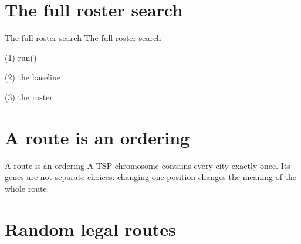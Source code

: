 \section{The full roster search}

\begin{frame}{The full roster search}
The full roster search
\end{frame}

\begin{frame}[fragile]{(1) run()}

\end{frame}

\begin{frame}[fragile]{(2) the baseline}

\end{frame}

\begin{frame}[fragile]{(3) the roster}

\end{frame}


\section{A route is an ordering}

\begin{frame}{A route is an ordering}
A TSP chromosome contains every city exactly once. Its genes are not separate
choices: changing one position changes the meaning of the whole route.
\end{frame}


\section{Random legal routes}

